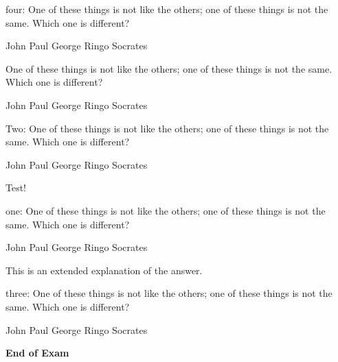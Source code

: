 \documentclass[]{exam}
\newcommand{\sol}[1]{{\ifprintanswers \color{red} #1 \fi}}
\newcommand{\questionp}[1]{\begin{minipage}{\textwidth}
  \question #1
  \end{minipage}}
\begin{document}
\begin{questions}




\questionp{
four: One of these things is not like the others; one of these
things is not the same. Which one is different?

\begin{randomizechoices}
\choice John
\choice Paul
\choice George
\choice Ringo
\CorrectChoice Socrates
\end{randomizechoices}
}

\questionp{
One of these things is not like the others; one of these
things is not the same. Which one is different?

\begin{randomizechoices}
\choice John
\choice Paul
\choice George
\choice Ringo
\CorrectChoice Socrates
\end{randomizechoices}
}

\questionp{
Two: One of these things is not like the others; one of these
things is not the same. Which one is different?

\begin{randomizechoices}
\choice John
\choice Paul
\choice George
\choice Ringo
\CorrectChoice Socrates
\end{randomizechoices}

\sol{Test!}
}

\questionp{
one: One of these things is not like the others; one of these
things is not the same. Which one is different?

\begin{randomizechoices}
\choice John
\choice Paul
\choice George
\choice Ringo
\CorrectChoice Socrates
\end{randomizechoices}
\sol{This is an extended explanation of the answer.}
}

\questionp{
three: One of these things is not like the others; one of these
things is not the same. Which one is different?

\begin{randomizechoices}
\choice John
\choice Paul
\choice George
\choice Ringo
\CorrectChoice Socrates
\end{randomizechoices}
}



\end{questions}


\vspace*{\fill}
\Huge \begin{center} \textbf{End of Exam} \end{center}
\end{document}
